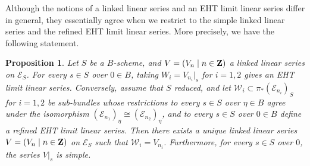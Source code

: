 \documentclass[11pt,reqno]{amsart}
\theoremstyle{plain}
\newtheorem{proposition}[theorem]{Proposition}
\theoremstyle{definition}
\theoremstyle{remark}
\numberwithin{equation}{section}
\numberwithin{equation}{section}
\begin{document}
Although the notions of a linked linear series and an EHT limit linear series differ in general, they essentially agree when we restrict to the simple linked linear series and the refined EHT limit linear series.
More precisely, we have the following statement.
\begin{proposition}\label{prop:llseht}
  Let $S$ be a $B$-scheme, and $V = (V_n \mid n \in {\bf Z})$ a linked linear series on $\mathcal E_S$.
  For every $s \in S$ over $0 \in B$, taking $W_i = V_{n_i}|_s$ for $i = 1, 2$ gives an EHT limit linear series.
  Conversely, assume that $S$ reduced, and let $\mathcal W_i \subset \pi_*(\mathcal E_{n_i})_S$ for $i = 1,2$ be sub-bundles whose restrictions to every $s \in S$ over $\eta \in B$ agree under the isomorphism $(\mathcal E_{n_1})_\eta \cong (\mathcal E_{n_2})_\eta$, and to every $s \in S$ over $0 \in B$ define a refined EHT limit linear series.
  Then there exists a unique linked linear series $V = (V_n \mid n \in {\bf Z})$ on $\mathcal E_S$ such that $\mathcal W_i = V_{n_i}$.
  Furthermore, for every $s \in S$ over $0$, the series $V|_s$ is simple.
\end{proposition}
\end{document}
